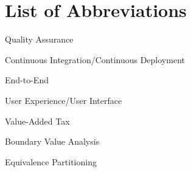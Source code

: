 \documentclass[12pt,a4paper]{report}
\begin{document}


\chapter*{List of Abbreviations}
\begin{description}[leftmargin=*, widest=DCCHTM]
    \item[QA] Quality Assurance
    \item[CI/CD] Continuous Integration/Continuous Deployment
    \item[E2E] End-to-End
    \item[UX/UI] User Experience/User Interface
    \item[VAT] Value-Added Tax
    \item[BVA] Boundary Value Analysis
    \item[EP] Equivalence Partitioning
\end{description}

\tableofcontents
\listoffigures










\end{document}
